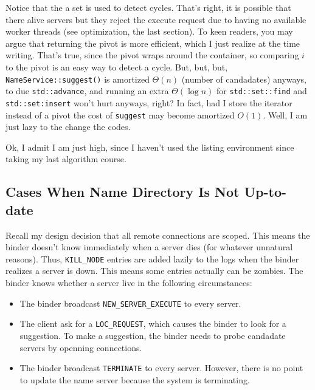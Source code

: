 Notice that the a set is used to detect cycles.
That's right, it is possible that there alive servers but they reject the execute request due to having no available worker threads (see optimization, the last section).
To keen readers, you may argue that returning the pivot is more efficient, which I just realize at the time writing.
That's true, since the pivot wraps around the container, so comparing $i$ to the pivot is an easy way to detect a cycle.
But, but, but, {\tt NameService::suggest()} is amortized $\Theta(n)$ (number of candadates)  anyways, to due {\tt std::advance}, and running an extra $\Theta(\log n)$ for {\tt std::set::find} and {\tt std::set:insert} won't hurt anyways, right?
In fact, had I store the iterator instead of a pivot the cost of {\tt suggest} may become amortized $O(1)$.
Well, I am just lazy to the change the codes.

Ok, I admit I am just high, since I haven't used the listing environment since taking my last algorithm course.

\subsection{Cases When Name Directory Is Not Up-to-date}
Recall my design decision that all remote connections are scoped.
This means the binder doesn't know immediately when a server dies (for whatever unnatural reasons).
Thus, {\tt KILL\_NODE} entries are added lazily to the logs when the binder realizes a server is down.
This means some entries actually can be zombies.
The binder knows whether a server live in the following circumstances:
\begin{itemize}
\item
The binder broadcast {\tt NEW\_SERVER\_EXECUTE} to every server.
\item
The client ask for a {\tt LOC\_REQUEST}, which causes the binder to look for a suggestion.
To make a suggestion, the binder needs to probe candadate servers by openning connections.
\item
The binder broadcast {\tt TERMINATE} to every server.
However, there is no point to update the name server because the system is terminating.
\end{itemize}

